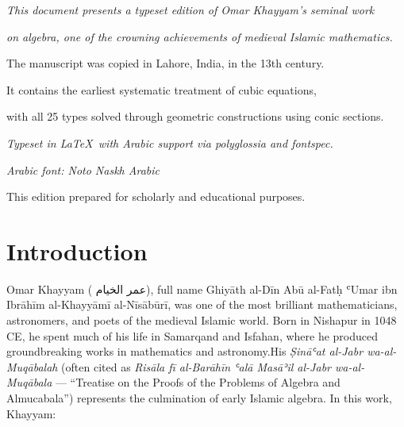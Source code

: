 

\thispagestyle{empty}
\vspace*{10cm}

\begin{center}

{\small
\textit{This document presents a typeset edition of Omar Khayyam's seminal work}}

{\small
\textit{on algebra, one of the crowning achievements of medieval Islamic mathematics.}}

\vspace{0.5cm}
{\small The manuscript was copied in Lahore, India, in the 13th century.}

{\small It contains the earliest systematic treatment of cubic equations,}

{\small with all 25 types solved through geometric constructions using conic sections.}

\vspace{0.5cm}

{\small
\textit{Typeset in \LaTeX\ with Arabic support via polyglossia and fontspec.}}

{\small
\textit{Arabic font: Noto Naskh Arabic}}

\vspace{0.5cm}

{\footnotesize This edition prepared for scholarly and educational purposes.}

\end{center}

\clearpage

\tableofcontents

\clearpage

\section{Introduction}

\label{sec:intro}

Omar Khayyam (
\textarabic{عمر الخيام}), full name Ghiyāth al-Dīn Abū al-Fatḥ ʿUmar ibn Ibrāhīm al-Khayyāmī al-Nīsābūrī, was one of the most brilliant mathematicians, astronomers, and poets of the medieval Islamic world. Born in Nishapur in 1048 CE, he spent much of his life in Samarqand and Isfahan, where he produced groundbreaking works in mathematics and astronomy.His 
\textit{Ṣināʿat al-Jabr wa-al-Muqābalah} (often cited as 
\textit{Risāla fī al-Barāhīn ʿalā Masāʾil al-Jabr wa-al-Muqābala} --- ``Treatise on the Proofs of the Problems of Algebra and Almucabala'') represents the culmination of early Islamic algebra. In this work, Khayyam:

